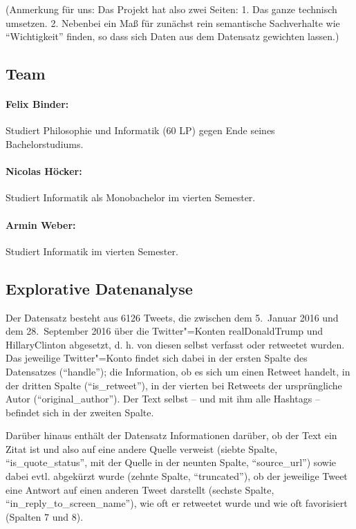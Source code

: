 \documentclass[BCOR0mm,fontsize=12pt,paper=a4,final,numbers=noenddot]{scrartcl}
\begin{document}
(Anmerkung für uns: Das Projekt hat also zwei Seiten: 1. Das ganze technisch umsetzen. 2. Nebenbei ein Maß für zunächst rein semantische Sachverhalte wie "`Wichtigkeit"' finden, so dass sich Daten aus dem Datensatz gewichten lassen.)

\subsection{Team}

\paragraph*{Felix Binder:} Studiert Philosophie und Informatik (60 LP) gegen Ende seines Bachelorstudiums.

\paragraph*{Nicolas Höcker:} Studiert Informatik als Monobachelor im vierten Semester.

\paragraph*{Armin Weber:} Studiert Informatik im vierten Semester.


\subsection{Explorative Datenanalyse}

Der Datensatz besteht aus 6126 Tweets, die zwischen dem 5.~Januar 2016 und dem 28.~September 2016 über die Twitter"=Konten realDonaldTrump und HillaryClinton abgesetzt, d.\,\,h. von diesen selbst verfasst oder retweetet wurden. Das jeweilige Twitter"=Konto findet sich dabei in der ersten Spalte des Datensatzes ("`handle"'); die Information, ob es sich um einen Retweet handelt, in der dritten Spalte ("`is\_retweet"'), in der vierten bei Retweets der ursprüngliche Autor ("`original\_author"'). Der Text selbst -- und mit ihm alle Hashtags -- befindet sich in der zweiten Spalte.

Darüber hinaus enthält der Datensatz Informationen darüber, ob der Text ein Zitat ist und also auf eine andere Quelle verweist (siebte Spalte, "`is\_quote\_status"', mit der Quelle in der neunten Spalte, "`source\_url"') sowie dabei evtl. abgekürzt wurde (zehnte Spalte, "`truncated"'), ob der jeweilige Tweet eine Antwort auf einen anderen Tweet darstellt (sechste Spalte, "`in\_reply\_to\_screen\_name"'), wie oft er retweetet wurde und wie oft favorisiert (Spalten 7 und 8).
\end{document}
